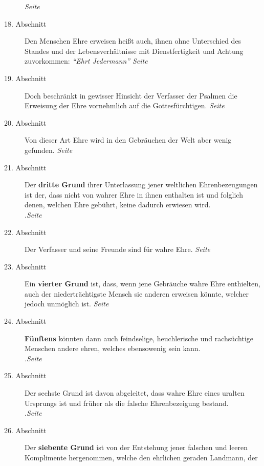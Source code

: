 \begin{description}
\dotfill \textit{Seite~\pageref{kap9_ab17}}\\
\item[18. Abschnitt] Den Menschen Ehre erweisen heißt auch, ihnen ohne
Unterschied des Standes und der Lebensverhältnisse mit Dienstfertigkeit und
Achtung zuvorkommen: \textit{"`Ehrt Jedermann"'}
\dotfill \textit{Seite~\pageref{kap9_ab18}}\\
\item[19. Abschnitt] Doch beschränkt in gewisser Hinsicht der Verfasser der
Psalmen die Erweisung der Ehre vornehmlich auf die Gottesfürchtigen.
\dotfill \textit{Seite~\pageref{kap9_ab19}}\\
\item[20. Abschnitt] Von dieser Art Ehre wird in den Gebräuchen der Welt aber
wenig gefunden.
\dotfill \textit{Seite~\pageref{kap9_ab20}}\\
\item[21. Abschnitt] Der \textbf{dritte Grund} ihrer Unterlassung jener
weltlichen
Ehrenbezeugungen ist der, dass nicht von wahrer Ehre in ihnen enthalten ist und
folglich denen, welchen Ehre gebührt, keine dadurch erwiesen wird.\\
.\dotfill \textit{Seite~\pageref{kap9_ab21}}\\
\item[22. Abschnitt] Der Verfasser und seine Freunde sind für wahre Ehre.
\dotfill \textit{Seite~\pageref{kap9_ab22}}\\
\item[23. Abschnitt] Ein \textbf{vierter Grund} ist, dass, wenn jene Gebräuche
wahre Ehre
enthielten, auch der niederträchtigste Mensch sie anderen erweisen könnte,
welcher jedoch unmöglich ist.
\dotfill \textit{Seite~\pageref{kap9_ab23}}\\
\item[24. Abschnitt] \textbf{Fünftens} könnten dann auch feindselige,
heuchlerische und
rachsüchtige Menschen andere ehren, welches ebensowenig sein kann.\\
.\dotfill \textit{Seite~\pageref{kap9_ab24}}\\
\item[25. Abschnitt] Der sechste Grund ist davon abgeleitet, dass wahre Ehre
eines uralten Ursprungs ist und früher als die falsche Ehrenbezeigung bestand.\\
.\dotfill \textit{Seite~\pageref{kap9_ab25}}\\
\item[26. Abschnitt] Der \textbf{siebente Grund} ist von der Entstehung jener
falschen
und leeren Komplimente hergenommen, welche den ehrlichen geraden Landmann, der

\end{description}
